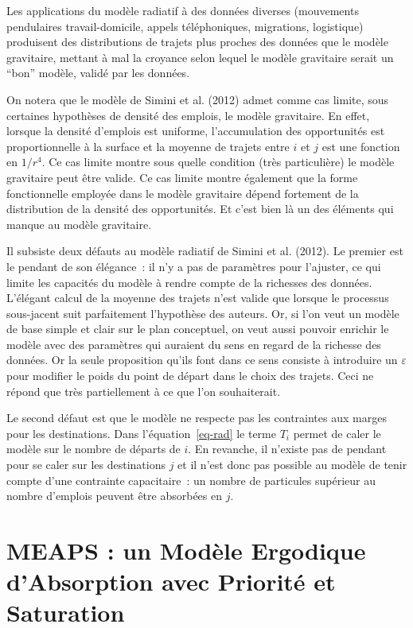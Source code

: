 \documentclass[
  10pt,
  a4paper,
  numbers=noendperiod,
  DIV=9]{scrartcl}
\begin{document}
Les applications du modèle radiatif à des données diverses (mouvements
pendulaires travail-domicile, appels téléphoniques, migrations,
logistique) produisent des distributions de trajets plus proches des
données que le modèle gravitaire, mettant à mal la croyance selon lequel
le modèle gravitaire serait un ``bon'' modèle, validé par les données.

On notera que le modèle de Simini et al. (2012) admet comme cas limite,
sous certaines hypothèses de densité des emplois, le modèle gravitaire.
En effet, lorsque la densité d'emplois est uniforme, l'accumulation des
opportunités est proportionnelle à la surface et la moyenne de trajets
entre \(i\) et \(j\) est une fonction en \(1/r^4\). Ce cas limite montre
sous quelle condition (très particulière) le modèle gravitaire peut être
valide. Ce cas limite montre également que la forme fonctionnelle
employée dans le modèle gravitaire dépend fortement de la distribution
de la densité des opportunités. Et c'est bien là un des éléments qui
manque au modèle gravitaire.

Il subsiste deux défauts au modèle radiatif de Simini et al. (2012). Le
premier est le pendant de son élégance~: il n'y a pas de paramètres pour
l'ajuster, ce qui limite les capacités du modèle à rendre compte de la
richesses des données. L'élégant calcul de la moyenne des trajets n'est
valide que lorsque le processus sous-jacent suit parfaitement
l'hypothèse des auteurs. Or, si l'on veut un modèle de base simple et
clair sur le plan conceptuel, on veut aussi pouvoir enrichir le modèle
avec des paramètres qui auraient du sens en regard de la richesse des
données. Or la seule proposition qu'ils font dans ce sens consiste à
introduire un \(\varepsilon\) pour modifier le poids du point de départ
dans le choix des trajets. Ceci ne répond que très partiellement à ce
que l'on souhaiterait.

Le second défaut est que le modèle ne respecte pas les contraintes aux
marges pour les destinations. Dans l'équation~\ref{eq-rad} le terme
\(T_i\) permet de caler le modèle sur le nombre de départs de \(i\). En
revanche, il n'existe pas de pendant pour se caler sur les destinations
\(j\) et il n'est donc pas possible au modèle de tenir compte d'une
contrainte capacitaire~: un nombre de particules supérieur au nombre
d'emplois peuvent être absorbées en \(j\).

\hypertarget{sec-meaps}{%
\section{MEAPS : un Modèle Ergodique d'Absorption avec Priorité et
Saturation}\label{sec-meaps}}
\end{document}
